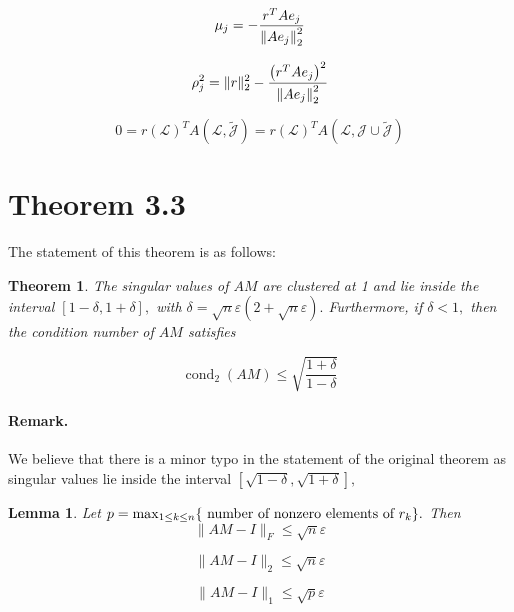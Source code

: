 \documentclass[paper=A4, fontsize=11pt]{scrartcl}
\let\originalleft\left
\let\originalright\right
\renewcommand{\left}{\mathopen{}\mathclose\bgroup\originalleft}
\renewcommand{\right}{\aftergroup\egroup\originalright}
\newtheorem{lemma}{Lemma}
\newtheorem{theorem}{Theorem}
\begin{document}
	\begin{equation}
	\mu_{j}=-\frac{r^{T} A e_{j}}{\left\|A e_{j}\right\|_{2}^{2}}
	\end{equation}
	
	\begin{equation}
	\rho_{j}^{2}=\|r\|_{2}^{2}-\frac{\left(r^{T} A e_{j}\right)^{2}}{\left\|A e_{j}\right\|_{2}^{2}}
	\end{equation}
	
	\begin{equation}
	0=r(\mathcal{L})^{T} A(\mathcal{L}, \tilde{\mathcal{J}})=r(\mathcal{L})^{T} A(\mathcal{L}, \mathcal{J} \cup \tilde{\mathcal{J}})
	\end{equation}
	
	\newpage

\section{Theorem 3.3}

The statement of this theorem is as follows: 
\begin{theorem}
The singular values of \(A M\) are clustered at 1 and lie inside the
interval \([1-\delta, 1+\delta],\) with \(\delta=\sqrt{n} \varepsilon(2+\sqrt{n} \varepsilon) .\) Furthermore, if \(\delta<1,\) then the
condition number of \(A M\) satisfies

\begin{equation}
\operatorname{cond}_{2}(A M) \leq \sqrt{\frac{1+\delta}{1-\delta}}
\end{equation}


\end{theorem}

\paragraph{Remark.} We believe that there is a minor typo in the statement of the original theorem as singular values lie inside the interval  \([\sqrt{1-\delta}, \sqrt{1+\delta}],\)


\begin{lemma}
Let \(p=\max _{1 \leq k \leq n}\left\{\text { number of nonzero elements of } r_{k}\right\} .\) Then
\begin{equation}
\|A M-I\|_{F} \leq \sqrt{n} \varepsilon
\end{equation}

\begin{equation}
\|A M-I\|_{2} \leq \sqrt{n} \varepsilon
\end{equation}

\begin{equation}
\|A M-I\|_{1} \leq \sqrt{p} \varepsilon
\end{equation}
\end{lemma}
\end{document}
